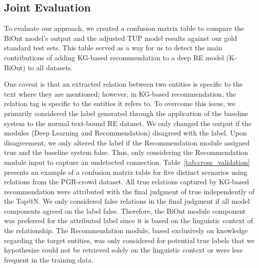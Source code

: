 \subsection{Joint Evaluation}

To evaluate our approach, we created a confusion matrix table to compare the BiOnt model's output and the adjusted TUP model results against our gold standard test sets. This table served as a way for us to detect the main contributions of adding KG-based recommendation to a deep RE model (K-BiOnt) to all datasets.

One caveat is that an extracted relation between two entities is specific to the text where they are mentioned; however, in KG-based recommendation, the relation tag is specific to the entities it refers to. To overcome this issue, we primarily considered the label generated through the application of the baseline system to the normal text-bound RE dataset. We only changed the output if the modules (Deep Learning and Recommendation) disagreed with the label. Upon disagreement, we only altered the label if the Recommendation module assigned true and the baseline system false. Thus, only considering the Recommendation module input to capture an undetected connection.   
Table~\ref{tab:cross_validation} presents an example of a confusion matrix table for five distinct scenarios using relations from the PGR-crowd dataset. All true relations captured by KG-based recommendation were attributed with the final judgment of true independently of the Top@N. We only considered false relations in the final judgment if all model components agreed on the label false. Therefore, the BiOnt module component was preferred for the attributed label since it is based on the linguistic context of the relationship. The Recommendation module, based exclusively on knowledge regarding the target entities, was only considered for potential true labels that we hypothesize could not be retrieved solely on the linguistic context or were less frequent in the training data. 

